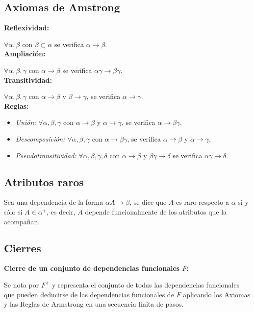\documentclass[12pt,a4paper]{article}
\theoremstyle{ejemplo}
\theoremstyle{algoritmo}
\begin{document}
\subsection*{Axiomas de Amstrong}

\textbf{Reflexividad:} 

$\forall\alpha,\beta$ con $\beta\subset\alpha$ se verifica $\alpha\to\beta$.
\\

\textbf{Ampliación:}

$\forall\alpha,\beta,\gamma$ con $\alpha\to\beta$ se verifica $\alpha\gamma
\to\beta\gamma$.
\\

\textbf{Transitividad:}

$\forall\alpha,\beta,\gamma$ con $\alpha\to\beta$ y $\beta\to\gamma$, se verifica
$\alpha\to\gamma$.
\\

\textbf{Reglas:}
\begin{itemize}
	\item \textit{Unión:} $\forall\alpha,\beta,\gamma$ con $\alpha\to\beta$ y 
	$\alpha\to\gamma$, se verifica $\alpha\to\beta\gamma$.
	\item \textit{Descomposición:} $\forall\alpha,\beta,\gamma$ con $\alpha\to
	\beta\gamma$, se verifica $\alpha\to\beta$ y $\alpha\to\gamma$.
	\item \textit{Pseudotransitividad:} $\forall\alpha,\beta,\gamma,\delta$ con
	$\alpha\to\beta$ y $\beta\gamma\to\delta$ se verifica $\alpha\gamma\to\delta$.
\end{itemize}

\subsection*{Atributos raros}
Sea una dependencia de la forma $\alpha A\to\beta$, se dice que $A$ es
raro respecto a $\alpha$ si y sólo si $A\in\alpha^+$, es decir, $A$ depende
funcionalmente de los atributos que la acompañan.
\subsection*{Cierres}

\textbf{Cierre de un conjunto de dependencias funcionales $F$:}

Se nota por $F^+$ y representa el conjunto de todas las dependencias 
funcionales que pueden deducirse de las dependencias funcionales de $F$ 
aplicando los Axiomas y las Reglas de Armstrong en una secuencia finita de pasos.
\\
\end{document}
